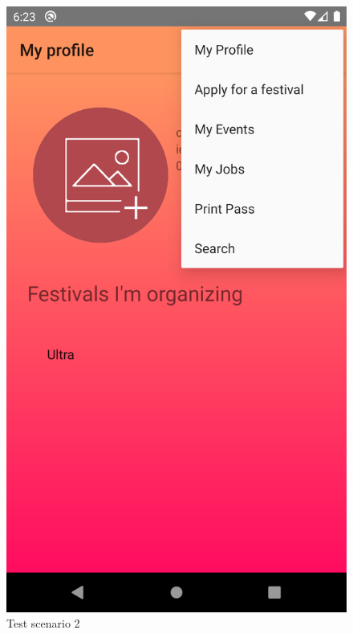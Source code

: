 	 		\begin{figure}[H]
	 			\includegraphics[width=\linewidth]{images/test_Screens/test_scenario_2-2.png}
	 			\caption{Test scenario 2}
	 			\label{fig:espresso_2_2}
	 		\end{figure}
	 		
